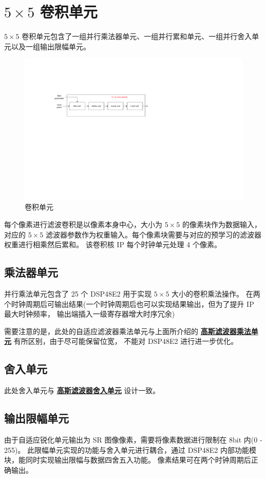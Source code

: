 \documentclass[12pt, a4paper, oneside]{ctexbook}
\begin{document}
	\section{$5\times5$ 卷积单元}
	$5\times5$ 卷积单元包含了一组并行乘法器单元、一组并行累和单元、一组并行舍入单元以及一组输出限幅单元。
		\begin{figure}[h]
		\centering
		\includegraphics[scale=0.7]{pic/conv.pdf}
		\caption{卷积单元}
		\end{figure}	
	每个像素进行滤波卷积是以像素本身中心，大小为 $5\times5$ 的像素块作为数据输入，
	对应的 $5\times5$ 滤波器参数作为权重输入。每个像素块需要与对应的预学习的滤波器权重进行相乘然后累和。
	该卷积核 IP 每个时钟单元处理 4 个像素。
	\subsection{乘法器单元}
	并行乘法单元包含了 25 个 DSP48E2 用于实现 $5\times5$ 大小的卷积乘法操作。
	在两个时钟周期后可输出结果(一个时钟周期后也可以实现结果输出，但为了提升 IP 最大时钟频率，
	输出端插入一级寄存器增大时序冗余) \par 需要注意的是，此处的自适应滤波器乘法单元与上面所介绍的 
	\hyperref[mul_unit]{\textbf{高斯滤波器乘法单元}} 有所区别，由于尽可能保留位宽，
	不能对 DSP48E2 进行进一步优化。%
	\subsection{舍入单元}
	此处舍入单元与 \hyperref[round_unit]{\textbf{高斯滤波器舍入单元}} 设计一致。		
	\subsection{输出限幅单元}
	由于自适应锐化单元输出为 SR 图像像素，需要将像素数据进行限制在 8bit 内(0 - 255)。
	此限幅单元实现的功能与舍入单元进行耦合，通过 DSP48E2 内部功能模块，能同时实现输出限幅与数据四舍五入功能。
	像素结果可在两个时钟周期后正确输出。
\end{document}
